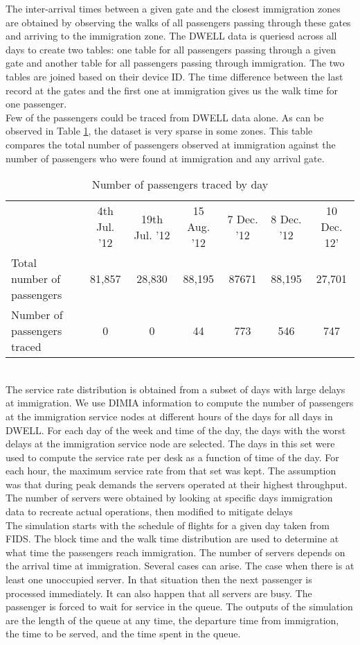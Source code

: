 \documentclass[11pt,onecolumn]{IEEEtran}
\begin{document}
The inter-arrival times between a given gate and the closest immigration zones are obtained by observing the walks of all passengers passing through these gates and arriving to the immigration zone.
The DWELL data is queriesd across all days to create two tables: one table for all passengers passing through a given gate  and another table for all passengers passing through immigration. The two tables are joined based on their device ID. The time difference between the last record at the gates and the first one at immigration gives us the walk time for one passenger.\\
 Few of the passengers could be traced from DWELL data alone. As can be observed in Table \ref{tab:passGateClassification}, the dataset is very sparse in some zones. This table compares the total number of passengers observed at immigration against the number of passengers who were found at immigration and any arrival gate.
\begin{table}[htp]
\caption{Number of passengers traced  by day}
\begin{tabular}{|l||c|c|c|c|c|c|}
\hline
& 4th Jul. '12 & 19th Jul. '12 & 15 Aug. '12 & 7 Dec. '12 & 8 Dec. '12 & 10 Dec. 12'\\
Total number of passengers 	& 81,857 	& 28,830 	& 88,195 	& 87671 & 88,195 	& 27,701\\
Number of passengers traced 	& 0 		& 0 		& 44 		& 773 	& 546 		& 747\\
\hline
\end{tabular}
\label{tab:passGateClassification}
\end{table}
\\
The service rate distribution is obtained from a subset of days with large delays at immigration. We use DIMIA information to compute the number of passengers at the immigration service nodes at different hours of the days for all days in DWELL. For each day of the week and time of the day, the days with the worst delays at the immigration service node are selected. 
The days in this set were used to compute the service rate per desk as a function of time of the day.
For each hour, the maximum service rate from that set was kept.
 The assumption was that during peak demands the servers operated at their highest throughput. The number of servers were  obtained by looking at specific days immigration data to recreate actual operations, then modified to mitigate delays\\


The simulation starts with the schedule of flights for a given day taken from FIDS. The block time and the walk time distribution are used to determine at what time the passengers reach immigration. The number of servers depends on the arrival time at immigration.
Several cases can arise. The case when there is at least one unoccupied server. In that situation then the next passenger is processed immediately. It can also happen that all servers are busy. The passenger is forced to wait for service in the queue.
The outputs of the simulation are the length of the queue at any time, the departure time from immigration, the time to be served, and the time spent in the queue.
\clearpage
\end{document}
